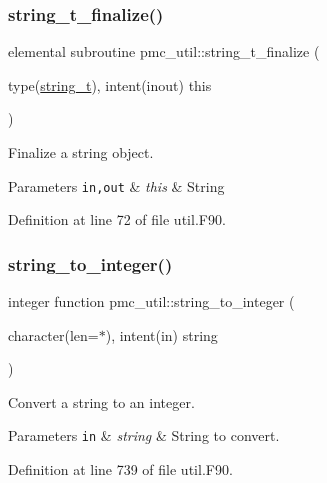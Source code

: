 \subsubsection{\texorpdfstring{string\+\_\+t\+\_\+finalize()}{string\_t\_finalize()}}
{\footnotesize\ttfamily elemental subroutine pmc\+\_\+util\+::string\+\_\+t\+\_\+finalize (\begin{DoxyParamCaption}\item[{type(\mbox{\hyperlink{structpmc__util_1_1string__t}{string\+\_\+t}}), intent(inout)}]{this }\end{DoxyParamCaption})}



Finalize a string object. 


\begin{DoxyParams}[1]{Parameters}
\mbox{\tt in,out}  & {\em this} & String \\
\hline
\end{DoxyParams}


Definition at line 72 of file util.\+F90.

\mbox{\label{namespacepmc__util_aa4e6c3a50b7def19b9ce4cf85a0816ca}} 
\subsubsection{\texorpdfstring{string\+\_\+to\+\_\+integer()}{string\_to\_integer()}}
{\footnotesize\ttfamily integer function pmc\+\_\+util\+::string\+\_\+to\+\_\+integer (\begin{DoxyParamCaption}\item[{character(len=$\ast$), intent(in)}]{string }\end{DoxyParamCaption})}



Convert a string to an integer. 


\begin{DoxyParams}[1]{Parameters}
\mbox{\tt in}  & {\em string} & String to convert. \\
\hline
\end{DoxyParams}


Definition at line 739 of file util.\+F90.

\mbox{\label{namespacepmc__util_addbacdfdd34c9190924403097f717ab4}} 

